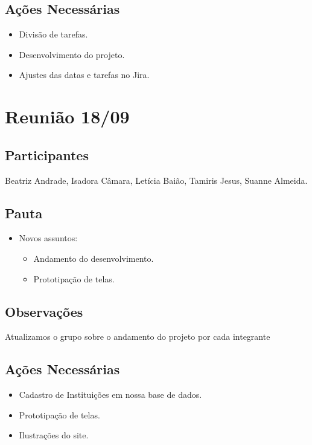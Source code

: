 \begin{apendicesenv}
\subsection*{Ações Necessárias}
\begin{itemize}
    \item Divisão de tarefas.
    \item Desenvolvimento do projeto.
    \item Ajustes das datas e tarefas no Jira. 
\end{itemize}

\section*{Reunião 18/09}

\subsection*{Participantes}
Beatriz Andrade, Isadora Câmara, Letícia Baião, Tamiris Jesus, Suanne Almeida.

\subsection*{Pauta}
\begin{itemize}
    \item Novos assuntos:
    \begin{itemize}
        \item Andamento do desenvolvimento.
        \item Prototipação de telas.
    \end{itemize}
\end{itemize}

\subsection*{Observações}
 Atualizamos o grupo sobre o andamento do projeto por cada integrante

\subsection*{Ações Necessárias}
\begin{itemize}
    \item Cadastro de Instituições em nossa base de dados.
    \item Prototipação de telas.
    \item Ilustrações do site.
\end{itemize}


\end{apendicesenv}
